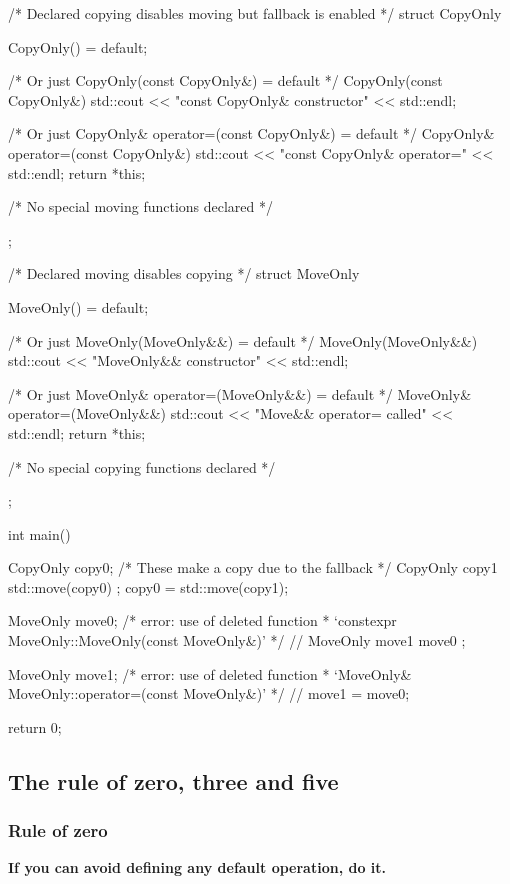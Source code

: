 \documentclass[../main]{subfiles}
\begin{document}
\begin{Code}
    /* Declared copying disables moving but fallback is enabled */
    struct CopyOnly
    {
        CopyOnly() = default;

        /* Or just CopyOnly(const CopyOnly&) = default */
        CopyOnly(const CopyOnly&)
        {
            std::cout << "const CopyOnly& constructor" << std::endl;
        }

        /* Or just CopyOnly& operator=(const CopyOnly&) = default */
        CopyOnly& operator=(const CopyOnly&)
        {
            std::cout << "const CopyOnly& operator=" << std::endl;
            return *this;
        }
    
        /* No special moving functions declared */
    };
    
    /* Declared moving disables copying */
    struct MoveOnly
    {
        MoveOnly() = default;

        /* Or just MoveOnly(MoveOnly&&) = default */
        MoveOnly(MoveOnly&&)
        {
            std::cout << "MoveOnly&& constructor" << std::endl;
        }

        /* Or just MoveOnly& operator=(MoveOnly&&) = default */
        MoveOnly& operator=(MoveOnly&&)
        {
            std::cout << "Move&& operator= called" << std::endl;
            return *this;
        }
        
        /* No special copying functions declared */
    };
    
    int main()
    {
        CopyOnly copy0;
        /* These make a copy due to the fallback */
        CopyOnly copy1 { std::move(copy0) };
        copy0 = std::move(copy1);
    
        MoveOnly move0;
        /* error: use of deleted function
         * ‘constexpr MoveOnly::MoveOnly(const MoveOnly&)’
         */
        // MoveOnly move1 { move0 };  
        
        MoveOnly move1;
        /* error: use of deleted function
         * ‘MoveOnly& MoveOnly::operator=(const MoveOnly&)’
         */
        // move1 = move0;
    
        return 0;
    }
\end{Code}

\subsection{The rule of zero, three and five}
\subsubsection{Rule of zero}
    \textbf{If you can avoid defining any default operation, do it.}
\end{document}
